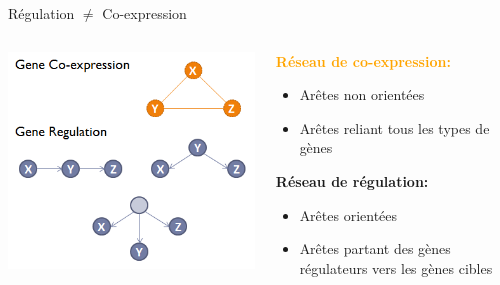 \begin{frame}{Régulation $\neq$ Co-expression}
	\begin{columns}[T] %
        \begin{column}{.45\textwidth}
            \includegraphics[scale = 0.65]{Figures/Intro/Gene_co-expression_vs_regulation.png}
        \end{column}
        \hfill%
        \begin{column}{.45\textwidth}
            \textcolor{orange}{\textbf{Réseau de co-expression:}}
                    \begin{itemize}
                      \item Arêtes non orientées
                      \item Arêtes reliant tous les types de gènes
                    \end{itemize}
            \vspace{0.5cm}
            \textcolor{Periwinkle}{\textbf{Réseau de régulation:}}
            \begin{itemize}
                  \item Arêtes orientées
                  \item Arêtes partant des gènes régulateurs vers les gènes cibles
            \end{itemize}
        \end{column}%
\end{columns}
\end{frame}
	
